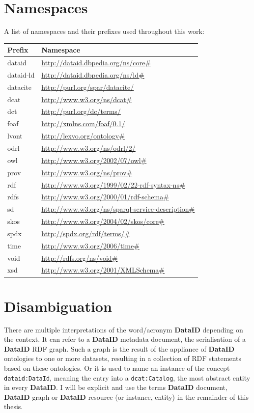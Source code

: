 \documentclass[a4paper,english,twoside,BCOR1.5cm,headsepline,DIV12,appendixprefix,final,12pt]{scrbook}
\newcommand{\dataid}{{\ttfamily\bfseries DataID}\xspace}
\newcommand{\prop}[1]{{{\texttt{#1}}}}
\begin{document}
\newpage
\thispagestyle{empty}

\section*{Namespaces}

A list of namespaces and their prefixes used throughout this work:

\begin{center}
\begin{tabular}{ |l|l| } 
 \hline
Prefix & Namespace\\
 \hline
dataid & \url{ http://dataid.dbpedia.org/ns/core#}\\
dataid-ld & \url{ http://dataid.dbpedia.org/ns/ld#}\\
datacite & \url{ http://purl.org/spar/datacite/}\\
dcat & \url{ http://www.w3.org/ns/dcat#}\\
dct & \url{ http://purl.org/dc/terms/}\\
foaf & \url{ http://xmlns.com/foaf/0.1/}\\
lvont & \url{ http://lexvo.org/ontology#}\\
odrl & \url{ http://www.w3.org/ns/odrl/2/}\\
owl & \url{ http://www.w3.org/2002/07/owl#}\\
prov & \url{ http://www.w3.org/ns/prov#}\\
rdf & \url{ http://www.w3.org/1999/02/22-rdf-syntax-ns#}\\
rdfs & \url{ http://www.w3.org/2000/01/rdf-schema#}\\
sd & \url{ http://www.w3.org/ns/sparql-service-description#}\\
skos & \url{ http://www.w3.org/2004/02/skos/core#}\\
spdx & \url{ http://spdx.org/rdf/terms/#}\\
time & \url{ http://www.w3.org/2006/time#}\\
void & \url{ http://rdfs.org/ns/void#}\\
xsd & \url{ http://www.w3.org/2001/XMLSchema#}\\
 \hline
\end{tabular}
\end{center}

\section*{Disambiguation}
There are multiple interpretations of the word/acronym \dataid depending on the context. It can refer to a \dataid metadata document, the serialisation of a \dataid RDF graph. Such a graph is the result of the appliance of \dataid ontologies to one or more datasets, resulting in a collection of RDF statements based on these ontologies. Or it is used to name an instance of the concept \prop{dataid:DataId}, meaning the entry into a \prop{dcat:Catalog}, the most abstract entity in every \dataid. I will be explicit and use the terms \dataid document, \dataid graph or \dataid resource (or instance, entity) in the remainder of this thesis.
\end{document}
